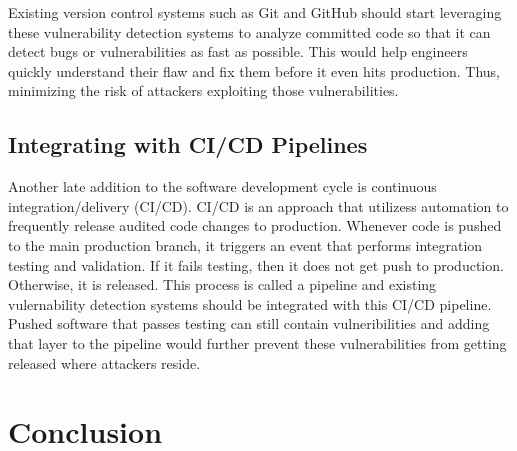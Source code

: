\documentclass[12pt,twocolumn,letterpaper]{article}
\begin{document}
Existing version control systems such as Git \cite{Torvalds05} and GitHub \cite{Werner08} should start leveraging these vulnerability 
detection systems to analyze committed code so that it can detect bugs or vulnerabilities as fast as 
possible. This would help engineers quickly understand their flaw and fix them before it even hits production.
Thus, minimizing the risk of attackers exploiting those vulnerabilities.

\subsection{Integrating with CI/CD Pipelines}
\label{sub:integrating-with-cicd-pipelines}

Another late addition to the software development cycle is continuous integration/delivery (CI/CD). 
CI/CD is an approach that utilizess automation to frequently release audited code changes to production. 
Whenever code is pushed to the main production branch, it triggers an event that performs integration 
testing and validation. If it fails testing, then it does not get push to production. Otherwise, it is 
released. This process is called a pipeline and existing vulernability detection systems should be integrated 
with this CI/CD pipeline. Pushed software that passes testing can still contain vulneribilities and adding 
that layer to the pipeline would further prevent these vulnerabilities from getting released where attackers 
reside.

\section{Conclusion}
\label{sec:conclusion}

{\small


}
\end{document}
